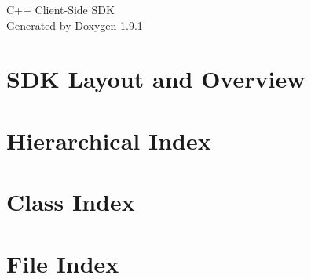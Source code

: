 \let\mypdfximage\pdfximage\def\pdfximage{\immediate\mypdfximage}\documentclass[twoside]{book}
\newcommand{\+}{\discretionary{\mbox{\scriptsize$\hookleftarrow$}}{}{}}
\newcommand{\clearemptydoublepage}{%
  \newpage{\pagestyle{empty}\cleardoublepage}%
}
\begin{document}
\raggedbottom

\hypersetup{pageanchor=false,
             bookmarksnumbered=true,
             pdfencoding=unicode
            }
\begin{titlepage}
\vspace*{7cm}
\begin{center}%
{\Large C++ Client-\/\+Side SDK }\\
\vspace*{1cm}
{\large Generated by Doxygen 1.9.1}\\
\end{center}
\end{titlepage}
\clearemptydoublepage
{}
\tableofcontents
\clearemptydoublepage
{}
\hypersetup{pageanchor=true}

\chapter{SDK Layout and Overview}
\label{index}\hypertarget{index}{}
\chapter{Hierarchical Index}

\chapter{Class Index}

\chapter{File Index}

\end{document}

